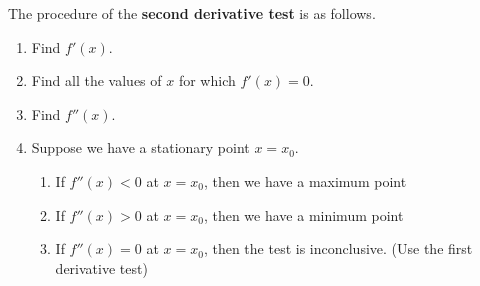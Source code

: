 \documentclass[11pt,a4paper]{book}
\begin{document}
\begin{tcolorbox}[colback=blue!5, colframe=black, boxrule=.4pt, sharpish corners]

The procedure of the \textbf{second derivative test} is as follows.
\begin{enumerate}
\item Find $f'\left(x\right)$.
\item Find all the values of $x$ for which $f'\left(x\right)=0$.
\item Find $f''\left(x\right)$.
\item Suppose we have a stationary point $x=x_{0}$.
\begin{enumerate}
\item If $f''\left(x\right)<0$ at $x=x_{0}$, then we have a maximum point
\item If $f''\left(x\right)>0$ at $x=x_{0}$, then we have a minimum point
\item If $f''\left(x\right)=0$ at $x=x_{0}$, then the test is inconclusive.
(Use the first derivative test)
\end{enumerate}
\end{enumerate}
\end{tcolorbox}
\end{document}
